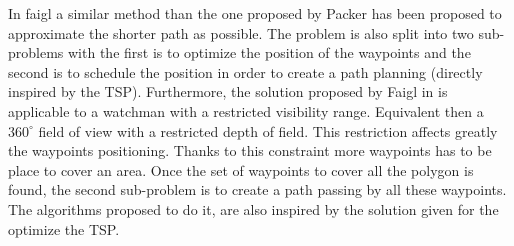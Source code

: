 
In faigl  \citep{235*faigl2010}  a similar method than the one proposed by Packer \citep{53*packer2008} has been proposed to approximate the shorter path as possible. The problem is also split into two sub-problems with the first is to optimize the position of the waypoints and the second is to schedule the position in order to create a path planning (directly inspired by the TSP). 
 Furthermore, the solution proposed by Faigl in \citep{235*faigl2010} is applicable to a watchman with a restricted visibility range. Equivalent then a $360^\circ$ field of view with a restricted depth of field. This restriction affects greatly the waypoints positioning. Thanks to this constraint more waypoints has to be place to cover an area.
 Once the set of waypoints to cover all the polygon is found, the second sub-problem is to create a path passing by all these waypoints.  The algorithms proposed  to do it, are also inspired by the solution given for the optimize the TSP.



